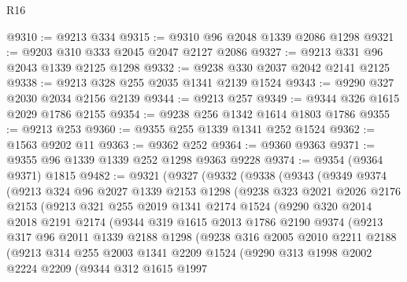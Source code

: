 \begin{lexlean}{R16}
\begin{coremodule}
@9310 := @9213 @334
@9315 := @9310 @96 @2048 @1339 @2086 @1298
@9321 := @9203 @310 @333 @2045 @2047 @2127 @2086
@9327 := @9213 @331 @96 @2043 @1339 @2125 @1298
@9332 := @9238 @330 @2037 @2042 @2141 @2125
@9338 := @9213 @328 @255 @2035 @1341 @2139 @1524
@9343 := @9290 @327 @2030 @2034 @2156 @2139
@9344 := @9213 @257
@9349 := @9344 @326 @1615 @2029 @1786 @2155
@9354 := @9238 @256 @1342 @1614 @1803 @1786
@9355 := @9213 @253
@9360 := @9355 @255 @1339 @1341 @252 @1524
@9362 := @1563 @9202 @11
@9363 := @9362 @252
@9364 := @9360 @9363
@9371 := @9355 @96 @1339 @1339 @252 @1298 @9363 @9228
@9374 := @9354 (@9364 @9371) @1815
@9482 := @9321
    (@9327
      (@9332
        (@9338
          (@9343
            (@9349
              @9374
              (@9213
                @324
                @96
                @2027
                @1339
                @2153
                @1298
                (@9238
                  @323
                  @2021
                  @2026
                  @2176
                  @2153
                  (@9213
                    @321
                    @255
                    @2019
                    @1341
                    @2174
                    @1524
                    (@9290
                      @320
                      @2014
                      @2018
                      @2191
                      @2174
                      (@9344
                        @319
                        @1615
                        @2013
                        @1786
                        @2190
                        @9374
                        (@9213
                          @317
                          @96
                          @2011
                          @1339
                          @2188
                          @1298
                          (@9238
                            @316
                            @2005
                            @2010
                            @2211
                            @2188
                            (@9213
                              @314
                              @255
                              @2003
                              @1341
                              @2209
                              @1524
                              (@9290
                                @313
                                @1998
                                @2002
                                @2224
                                @2209
                                (@9344
                                  @312
                                  @1615
                                  @1997

\end{coremodule}
\end{lexlean}
